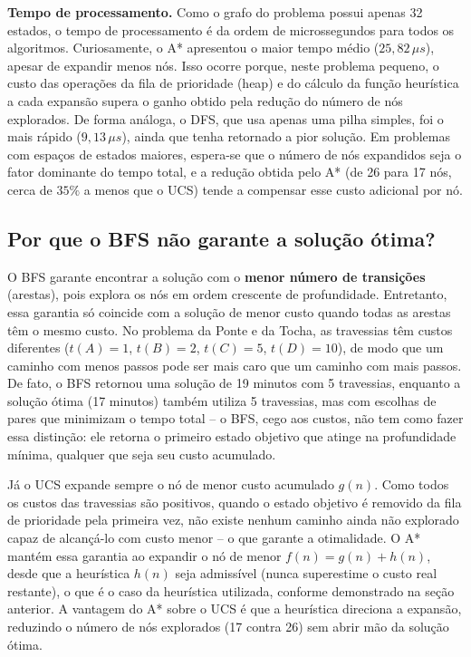 \documentclass{article}
\begin{document}
\textbf{Tempo de processamento.} Como o grafo do problema possui
apenas 32 estados, o tempo de processamento é da ordem de microssegundos
para todos os algoritmos. Curiosamente, o A* apresentou o maior tempo
médio ($25{,}82\,\mu s$), apesar de expandir menos nós. Isso ocorre
porque, neste problema pequeno, o custo das operações da fila de
prioridade (heap) e do cálculo da função heurística a cada expansão
supera o ganho obtido pela redução do número de nós explorados. De
forma análoga, o DFS, que usa apenas uma pilha simples, foi o mais
rápido ($9{,}13\,\mu s$), ainda que tenha retornado a pior solução.
Em problemas com espaços de estados maiores, espera-se que o número
de nós expandidos seja o fator dominante do tempo total, e a redução
obtida pelo A* (de 26 para 17 nós, cerca de $35\%$ a menos que o UCS)
tende a compensar esse custo adicional por nó.

\subsection{Por que o BFS não garante a solução ótima?}

O BFS garante encontrar a solução com o \textbf{menor número de
transições} (arestas), pois explora os nós em ordem crescente de
profundidade. Entretanto, essa garantia só coincide com a solução de
menor custo quando todas as arestas têm o mesmo custo. No problema da
Ponte e da Tocha, as travessias têm custos diferentes
($t(A)=1$, $t(B)=2$, $t(C)=5$, $t(D)=10$), de modo que um caminho com
menos passos pode ser mais caro que um caminho com mais passos. De
fato, o BFS retornou uma solução de 19 minutos com 5 travessias,
enquanto a solução ótima (17 minutos) também utiliza 5 travessias, mas
com escolhas de pares que minimizam o tempo total -- o BFS, cego aos
custos, não tem como fazer essa distinção: ele retorna o primeiro
estado objetivo que atinge na profundidade mínima, qualquer que seja
seu custo acumulado.

Já o UCS expande sempre o nó de menor custo acumulado $g(n)$. Como
todos os custos das travessias são positivos, quando o estado objetivo
é removido da fila de prioridade pela primeira vez, não existe nenhum
caminho ainda não explorado capaz de alcançá-lo com custo menor -- o
que garante a otimalidade. O A* mantém essa garantia ao expandir o nó
de menor $f(n)=g(n)+h(n)$, desde que a heurística $h(n)$ seja
admissível (nunca superestime o custo real restante), o que é o caso
da heurística utilizada, conforme demonstrado na seção anterior. A
vantagem do A* sobre o UCS é que a heurística direciona a expansão,
reduzindo o número de nós explorados (17 contra 26) sem abrir mão da
solução ótima.
\end{document}
